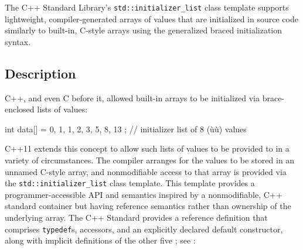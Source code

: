 
\label{list-initialization:-std::initializer_list<t>}
\setcounter{table}{0}
\setcounter{footnote}{0}
\setcounter{lstlisting}{0}

The C++ Standard Library's \lstinline!std::initializer_list! class
template supports lightweight, compiler-generated arrays of values that
are initialized in source code similarly to built-in, C-style arrays
using the generalized braced initialization syntax.

\subsection[Description]{Description}\label{description}

C++, and even C before it, allowed built-in arrays to be initialized via
brace-enclosed lists of values:

\begin{emcppslisting}
int data[] = { 0, 1, 1, 2, 3, 5, 8, 13 };  // initializer list of 8 (ù{}ù) values
\end{emcppslisting}
    

\noindent C++11 extends this concept to allow such lists of values to be provided
to  in a variety of circumstances. The
compiler arranges for the values to be stored in an unnamed C-style
array, and nonmodifiable access to that array is provided via the
\lstinline!std::initializer_list! class template. This template provides a
programmer-accessible API and semantics inspired by a nonmodifiable, C++
standard container but having reference semantics rather than ownership
of the underlying array. The C++ Standard provides a reference
definition that comprises \lstinline!typedef!s, accessors, and an
explicitly declared default constructor, along with implicit definitions
of the other five ; see : 

